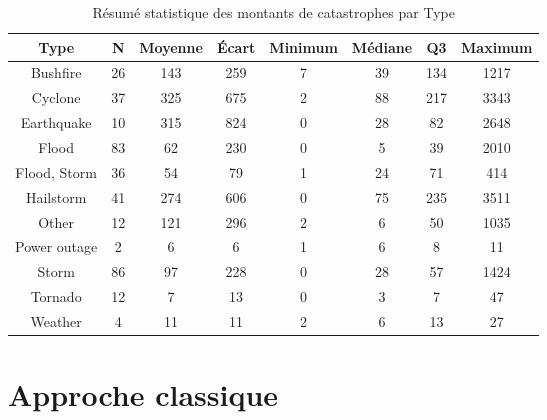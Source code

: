 \begin{table}[ht]
\centering
\begin{tabular}{cccccccc}
  \hline
Type & N & Moyenne & Écart & Minimum & Médiane & Q3 & Maximum \\ 
  \hline
Bushfire & 26 & 143 & 259 & 7 & 39 & 134 & 1217 \\ 
  Cyclone & 37 & 325 & 675 & 2 & 88 & 217 & 3343 \\ 
  Earthquake & 10 & 315 & 824 & 0 & 28 & 82 & 2648 \\ 
  Flood & 83 & 62 & 230 & 0 & 5 & 39 & 2010 \\ 
  Flood, Storm & 36 & 54 & 79 & 1 & 24 & 71 & 414 \\ 
  Hailstorm & 41 & 274 & 606 & 0 & 75 & 235 & 3511 \\ 
  Other & 12 & 121 & 296 & 2 & 6 & 50 & 1035 \\ 
  Power outage & 2 & 6 & 6 & 1 & 6 & 8 & 11 \\ 
  Storm & 86 & 97 & 228 & 0 & 28 & 57 & 1424 \\ 
  Tornado & 12 & 7 & 13 & 0 & 3 & 7 & 47 \\ 
  Weather & 4 & 11 & 11 & 2 & 6 & 13 & 27 \\ 
   \hline
\end{tabular}
\caption{Résumé statistique des montants de catastrophes par Type} 
\label{tab:3.6}
\end{table}
\clearpage
\section{Approche classique}

